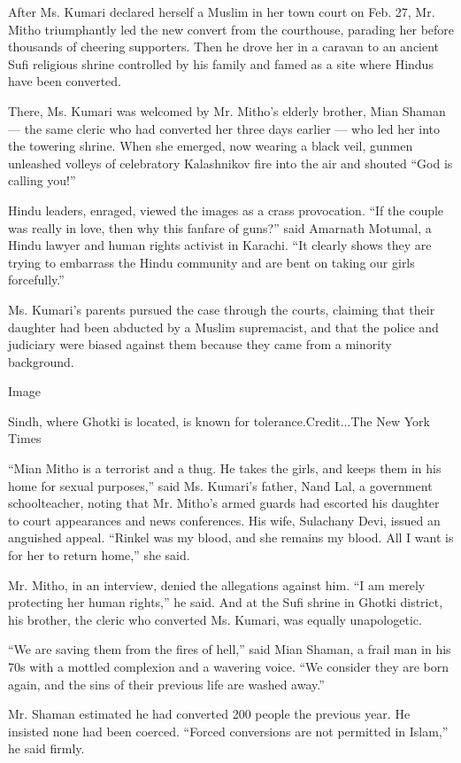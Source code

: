 After Ms. Kumari declared herself a Muslim in her town court on Feb. 27,
Mr. Mitho triumphantly led the new convert from the courthouse, parading
her before thousands of cheering supporters. Then he drove her in a
caravan to an ancient Sufi religious shrine controlled by his family and
famed as a site where Hindus have been converted.

There, Ms. Kumari was welcomed by Mr. Mitho's elderly brother, Mian
Shaman --- the same cleric who had converted her three days earlier ---
who led her into the towering shrine. When she emerged, now wearing a
black veil, gunmen unleashed volleys of celebratory Kalashnikov fire
into the air and shouted ``God is calling you!''

Hindu leaders, enraged, viewed the images as a crass provocation. ``If
the couple was really in love, then why this fanfare of guns?'' said
Amarnath Motumal, a Hindu lawyer and human rights activist in Karachi.
``It clearly shows they are trying to embarrass the Hindu community and
are bent on taking our girls forcefully.''

Ms. Kumari's parents pursued the case through the courts, claiming that
their daughter had been abducted by a Muslim supremacist, and that the
police and judiciary were biased against them because they came from a
minority background.

Image

Sindh, where Ghotki is located, is known for tolerance.Credit...The New
York Times

``Mian Mitho is a terrorist and a thug. He takes the girls, and keeps
them in his home for sexual purposes,'' said Ms. Kumari's father, Nand
Lal, a government schoolteacher, noting that Mr. Mitho's armed guards
had escorted his daughter to court appearances and news conferences. His
wife, Sulachany Devi, issued an anguished appeal. ``Rinkel was my blood,
and she remains my blood. All I want is for her to return home,'' she
said.

Mr. Mitho, in an interview, denied the allegations against him. ``I am
merely protecting her human rights,'' he said. And at the Sufi shrine in
Ghotki district, his brother, the cleric who converted Ms. Kumari, was
equally unapologetic.

``We are saving them from the fires of hell,'' said Mian Shaman, a frail
man in his 70s with a mottled complexion and a wavering voice. ``We
consider they are born again, and the sins of their previous life are
washed away.''

Mr. Shaman estimated he had converted 200 people the previous year. He
insisted none had been coerced. ``Forced conversions are not permitted
in Islam,'' he said firmly.

